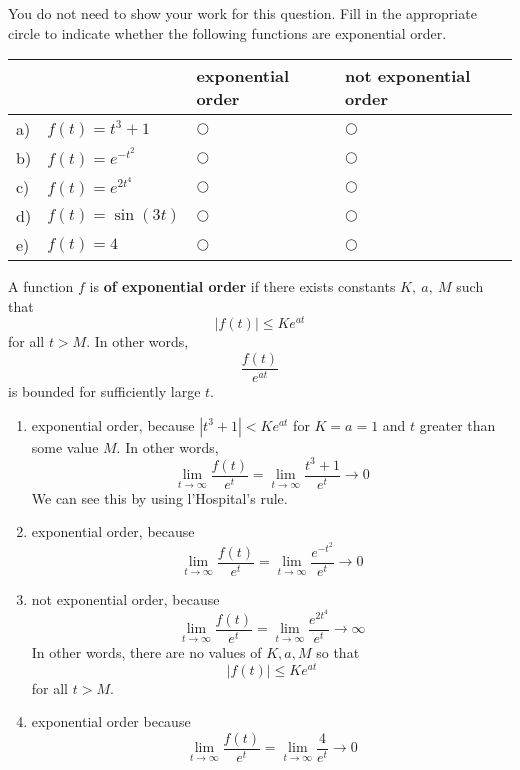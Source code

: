 \ifnum {}    
\question[2] You do not need to show your work for this question. Fill in the appropriate circle to indicate whether the following functions are exponential order. 
\vspace{-0.2cm}
\setlength{\extrarowheight}{0.10cm}
\begin{center}
\hspace{-.9cm}\begin{tabular}{ p{0.20cm} p{4cm} p{3.5cm} p{4cm} }
    & & exponential order &  not exponential order  \\[2pt] \hline 
    a) & $f(t) = t^3+1$ & $\bigcirc$  & $\bigcirc$ \\[4pt]  
    b) & $f(t) = e^{-t^2}$  & $\bigcirc$  & $\bigcirc$ \\[4pt] 
    c) & $f(t) = e^{2t^4}$  & $\bigcirc$  & $\bigcirc$ \\[4pt] 
    d) & $f(t) = \sin(3t)$  & $\bigcirc$  & $\bigcirc$ \\[4pt] 
    e) & $f(t) = 4$  & $\bigcirc$  & $\bigcirc$ \\[4pt] 
    \hline
\end{tabular}
\end{center}
\setlength{\extrarowheight}{0.0cm}
\ifnum {} {\color{DarkBlue} A function 
$f$ is \textbf{of exponential order} if there exists constants $K, \ a, \ M$ such that $$  |f(t)| \leq Ke^{at}  $$ for all $t > M$. In other words, $$ \frac{f(t)}{e^{at}}  $$ is bounded for sufficiently large $t$.
\begin{enumerate}[label=(\alph*)]
    \item exponential order, because $|t^3+1| < Ke^{at}$ for $K=a=1$ and $t$ greater than some value $M$. In other words, $$\lim_{t\to \infty}\frac{f(t)}{e^t} = \lim_{t\to \infty}\frac{t^3+1}{e^t} \to 0$$ We can see this by using l'Hospital's rule. 
    \item exponential order, because $$\lim_{t\to \infty}\frac{f(t)}{e^t} = \lim_{t\to \infty}\frac{e^{-t^2}}{e^t} \to 0$$
    \item not exponential order, because 
    $$\lim_{t\to \infty}\frac{f(t)}{e^t} = \lim_{t\to \infty}\frac{e^{2t^4}}{e^t} \to \infty$$ In other words, there are no values of $K,a,M$ so that $$  |f(t)| \leq Ke^{at}  $$ for all $t > M$.
    \item exponential order because $$\lim_{t\to \infty}\frac{f(t)}{e^t} = \lim_{t\to \infty}\frac{4}{e^t} \to 0$$
\end{enumerate}
}
\fi
\vspace{-6pt} 
\fi 



